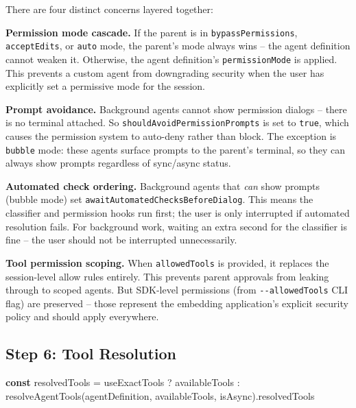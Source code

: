 \documentclass[
  english,
  11pt,
  letterpaper,
]{book}
\newenvironment{Shaded}{\begin{snugshade}}{\end{snugshade}}
\newcommand{\AttributeTok}[1]{\textcolor[rgb]{0.40,0.45,0.13}{#1}}
\newcommand{\FunctionTok}[1]{\textcolor[rgb]{0.28,0.35,0.67}{#1}}
\newcommand{\KeywordTok}[1]{\textcolor[rgb]{0.00,0.23,0.31}{\textbf{#1}}}
\newcommand{\NormalTok}[1]{\textcolor[rgb]{0.00,0.23,0.31}{#1}}
\newcommand{\OperatorTok}[1]{\textcolor[rgb]{0.37,0.37,0.37}{#1}}
\begin{document}
There are four distinct concerns layered together:

\textbf{Permission mode cascade.} If the parent is in
\texttt{bypassPermissions}, \texttt{acceptEdits}, or \texttt{auto} mode,
the parent's mode always wins -- the agent definition cannot weaken it.
Otherwise, the agent definition's \texttt{permissionMode} is applied.
This prevents a custom agent from downgrading security when the user has
explicitly set a permissive mode for the session.

\textbf{Prompt avoidance.} Background agents cannot show permission
dialogs -- there is no terminal attached. So
\texttt{shouldAvoidPermissionPrompts} is set to \texttt{true}, which
causes the permission system to auto-deny rather than block. The
exception is \texttt{bubble} mode: these agents surface prompts to the
parent's terminal, so they can always show prompts regardless of
sync/async status.

\textbf{Automated check ordering.} Background agents that \emph{can}
show prompts (bubble mode) set
\texttt{awaitAutomatedChecksBeforeDialog}. This means the classifier and
permission hooks run first; the user is only interrupted if automated
resolution fails. For background work, waiting an extra second for the
classifier is fine -- the user should not be interrupted unnecessarily.

\textbf{Tool permission scoping.} When \texttt{allowedTools} is
provided, it replaces the session-level allow rules entirely. This
prevents parent approvals from leaking through to scoped agents. But
SDK-level permissions (from \texttt{-\/-allowedTools} CLI flag) are
preserved -- those represent the embedding application's explicit
security policy and should apply everywhere.

\subsection{Step 6: Tool Resolution}\label{step-6-tool-resolution}

\begin{Shaded}
\begin{Highlighting}[]
\KeywordTok{const}\NormalTok{ resolvedTools }\OperatorTok{=}\NormalTok{ useExactTools}
  \OperatorTok{?}\NormalTok{ availableTools}
  \OperatorTok{:} \FunctionTok{resolveAgentTools}\NormalTok{(agentDefinition}\OperatorTok{,}\NormalTok{ availableTools}\OperatorTok{,}\NormalTok{ isAsync)}\OperatorTok{.}\AttributeTok{resolvedTools}
\end{Highlighting}
\end{Shaded}
\end{document}
